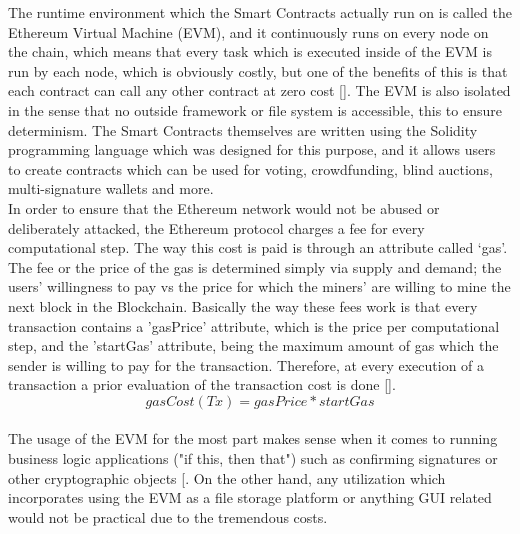 The runtime environment which the Smart Contracts actually run on is called the Ethereum Virtual Machine (EVM), and it continuously runs on every node on the chain, which means that every task which is executed inside of the EVM is run by each node, which is obviously costly, but one of the benefits of this is that each contract can call any other contract at zero cost [\cite{Buterin2014}]. The EVM is also isolated in the sense that no outside framework or file system is accessible, this to ensure determinism. The Smart Contracts themselves are written using the Solidity programming language which was designed for this purpose, and it allows users to create contracts which can be used for voting, crowdfunding, blind auctions, multi-signature wallets and more.\\

In order to ensure that the Ethereum network would not be abused or deliberately attacked, the Ethereum protocol charges a fee for every computational step. The way this cost is paid is through an attribute called ‘gas’. The fee or the price of the gas is determined simply via supply and demand; the users’ willingness to pay vs the price for which the miners' are willing to mine the next block in the Blockchain. Basically the way these fees work is that every transaction contains a 'gasPrice' attribute, which is the price per computational step, and the 'startGas' attribute, being the maximum amount of gas which the sender is willing to pay for the transaction. Therefore, at every execution of a transaction a prior evaluation of the transaction cost is done [\cite{Buterin2014}].\\

				\[ gasCost(Tx)= {gasPrice * startGas}\]
\\
The usage of the EVM for the most part makes sense when it comes to running business logic applications ("if this, then that") such as confirming signatures or other cryptographic objects [\cite{Ethereum2017}. On the other hand, any utilization which incorporates using the EVM as a file storage platform or anything GUI related would not be practical due to the tremendous costs. 


